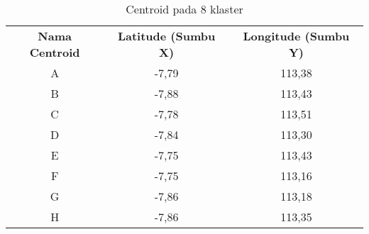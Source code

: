 \begin{table}[H]
\footnotesize
\centering
\begin{tabular}{ccc}
\rowcolor[HTML]{4472C4} 
{\color[HTML]{FFFFFF} \textbf{Nama   Centroid}} & {\color[HTML]{FFFFFF} \textbf{Latitude (Sumbu X)}} & {\color[HTML]{FFFFFF} \textbf{Longitude (Sumbu Y)}} \\
\rowcolor[HTML]{D9E1F2} 
A & -7,79 & 113,38 \\
B & -7,88 & 113,43 \\
\rowcolor[HTML]{D9E1F2} 
C & -7,78 & 113,51 \\
D & -7,84 & 113,30 \\
\rowcolor[HTML]{D9E1F2} 
E & -7,75 & 113,43 \\
F & -7,75 & 113,16 \\
\rowcolor[HTML]{D9E1F2} 
G & -7,86 & 113,18 \\
H & -7,86 & 113,35
\end{tabular}
\caption{Centroid pada 8 klaster}
\label{tab:center8}
\end{table}